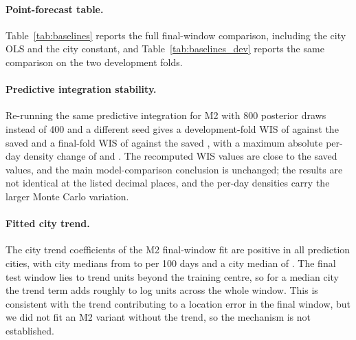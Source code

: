 \documentclass{article}
\begin{document}
\paragraph{Point-forecast table.}
Table~\ref{tab:baselines} reports the full final-window comparison, including the city OLS and the
city constant, and Table~\ref{tab:baselines_dev} reports the same comparison on the two development
folds.

\begin{table}[h]
\centering
\footnotesize
\caption{Point-forecast error on the final window, in log-scale MAE on $\log(1+\text{usage})$,
city-equal and lower is better. M0 and M2 come from the independent recomputation of their saved
daily predictions; the four baselines come from a supplementary check completed before this
write-up.}
\label{tab:baselines}

\end{table}

\begin{table}[h]
\centering
\footnotesize
\caption{Point-forecast error in log-scale MAE on $\log(1+\text{usage})$, city-equal, lower is
better, recomputed from the saved daily predictions.}
\label{tab:baselines_dev}

\end{table}

\paragraph{Predictive integration stability.}
Re-running the same predictive integration for M2 with 800 posterior draws instead of 400 and a
different seed gives a development-fold WIS of \IntegDevOneWisNew{} against the saved
\IntegDevOneWisSaved{} and a final-fold WIS of \IntegFinalWisNew{} against the saved
\IntegFinalWisSaved{}, with a maximum absolute per-day density change of \DensityStabilityDevOne{} and
\DensityStabilityFinal. The recomputed WIS values are close to the saved values, and the main
model-comparison conclusion is unchanged; the results are not identical at the listed decimal places,
and the per-day densities carry the larger Monte Carlo variation.

\paragraph{Fitted city trend.}
The city trend coefficients of the M2 final-window fit are positive in all \PredCityCount{} prediction
cities, with city medians from \TrendCityMin{} to \TrendCityMax{} per 100 days and a city median of
\TrendCityMedian. The final test window lies \TrendWindowLow{} to \TrendWindowHigh{} trend units
beyond the training centre, so for a median city the trend term adds roughly \TrendLogLow{} to
\TrendLogHigh{} log units across the whole window. This is consistent with the trend contributing to a
location error in the final window, but we did not fit an M2 variant without the trend, so the
mechanism is not established.
\end{document}
